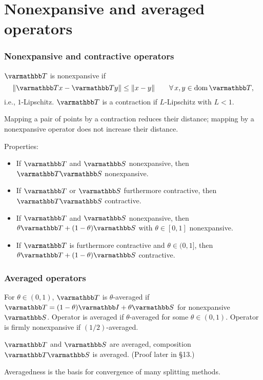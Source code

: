 \documentclass[10pt,mathserif]{beamer}
\begin{document}
\section{Nonexpansive and averaged operators}
\begin{frame}
\frametitle{Nonexpansive and contractive operators}
$\opT $ is nonexpansive if
\[
\|\opT x-\opT y\|\le \|x-y\|
\qquad\forall\,x,y\in \dom \opT,
\]
i.e., $1$-Lipschitz.
$\opT $ is a contraction if $L$-Lipschitz with $L<1$.

\vspace{0.2in}
Mapping a pair of points by a contraction reduces their distance; mapping by a nonexpansive operator does not increase their distance.

\vspace{0.2in}
Properties:
\begin{itemize}
\item If $\opT $ and $\opS $ nonexpansive, then $\opT \opS $ nonexpansive.
\item If $\opT $ or $\opS $ furthermore contractive, then $\opT \opS $ contractive.
\item If $\opT $ and $\opS $ nonexpansive, then $\theta \opT  + (1-\theta)  \opS $ with $\theta \in [0,1]$ nonexpansive.
\item If $\opT $ is furthermore contractive and $\theta\in(0,1]$, then $\theta \opT  + (1-\theta)  \opS $  contractive.
\end{itemize}
\end{frame}


\begin{frame}
\frametitle{Averaged operators}
For $\theta\in (0,1)$, $\opT $ is $\theta$-averaged if $\opT =(1-\theta)\opI+\theta \opS $ for nonexpansive $\opS $.
Operator is averaged if $\theta$-averaged for some $\theta\in(0,1)$.
Operator is firmly nonexpansive if $(1/2)$-averaged.

\vspace{0.2in}

$\opT $ and $\opS $ are averaged, composition $\opT \opS $ is averaged.
(Proof later in \S13.)

\vspace{0.2in}

Averagedness is the basis for convergence of many splitting methods.
\end{frame}
\end{document}
